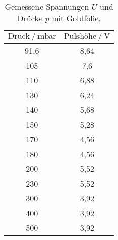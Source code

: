 \begin{table}[H]
   \centering
   \caption{Gemessene Spannungen $U$ und Drücke $p$ mit Goldfolie.}
   \label{tab:mit}
   \begin{tabular} { c c }
 \toprule
 {$\text{Druck}\:/\: \mathrm{mbar}$} & {$\text{Pulshöhe}\:/\: \mathrm{V}$} \\ 
    \midrule
    91,6 & 8,64 \\
    105 & 7,6 \\
    110 & 6,88 \\
    130 & 6,24 \\
    140 & 5,68 \\
    150 & 5,28 \\
    170 & 4,56 \\
    180 & 4,56 \\
    200 & 5,52 \\
    230 & 5,52 \\
    300 & 3,92 \\
    400 & 3,92 \\
    500 & 3,92 \\
    \bottomrule
  \end{tabular}
\end{table}

